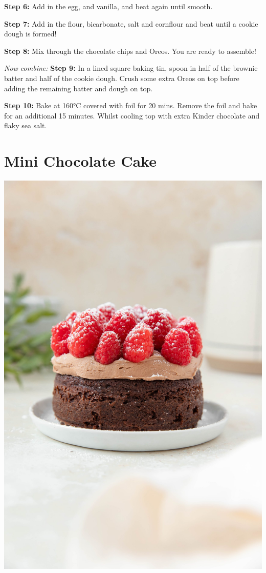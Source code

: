 \documentclass[
]{book}
\begin{document}
\textbf{Step 6:} Add in the egg, and vanilla, and beat again until
smooth.

\textbf{Step 7:} Add in the flour, bicarbonate, salt and cornflour and
beat until a cookie dough is formed!

\textbf{Step 8:} Mix through the chocolate chips and Oreos. You are
ready to assemble!

\emph{Now combine:} \textbf{Step 9:} In a lined square baking tin, spoon
in half of the brownie batter and half of the cookie dough. Crush some
extra Oreos on top before adding the remaining batter and dough on top.

\textbf{Step 10:} Bake at 160°C covered with foil for 20 mins. Remove
the foil and bake for an additional 15 minutes. Whilst cooling top with
extra Kinder chocolate and flaky sea salt.

\section*{Mini Chocolate Cake}\label{mini-chocolate-cake}

\includegraphics{mcc.jpg}
\end{document}
